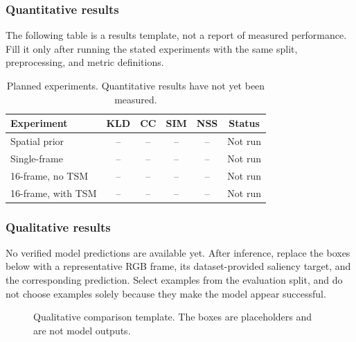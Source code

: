 \documentclass[10pt,twocolumn,letterpaper]{article}
\begin{document}
\subsubsection{Quantitative results}

The following table is a results template, not a report of measured
performance. Fill it only after running the stated experiments with the
same split, preprocessing, and metric definitions.

\begin{table}[t]
    \centering
    \caption{Planned experiments. Quantitative results have not yet been
    measured.}
    \label{tab:planned}
    \begin{tabular}{lccccc}
        \toprule
        Experiment & KLD & CC & SIM & NSS & Status \\
        \midrule
        Spatial prior & -- & -- & -- & -- & Not run \\
        Single-frame & -- & -- & -- & -- & Not run \\
        16-frame, no TSM & -- & -- & -- & -- & Not run \\
        16-frame, with TSM & -- & -- & -- & -- & Not run \\
        \bottomrule
    \end{tabular}
\end{table}

\subsubsection{Qualitative results}

No verified model predictions are available yet. After inference, replace the
boxes below with a representative RGB frame, its dataset-provided saliency
target, and the corresponding prediction. Select examples from the evaluation
split, and do not choose examples solely because they make the model appear
successful.

\begin{figure}[t]
    \centering
    \setlength{\fboxsep}{5pt}
    \hfill
    \hfill
    \caption{Qualitative comparison template. The boxes are placeholders and
    are not model outputs.}
    \label{fig:qualitative-template}
\end{figure}
\end{document}

